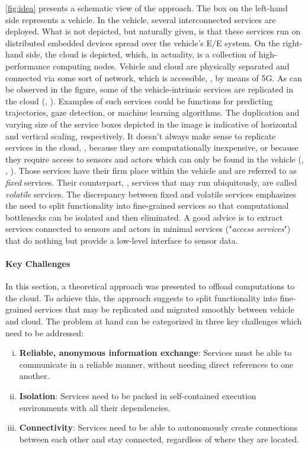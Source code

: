 \autoref{fig:idea} presents a schematic view of the approach. The box on the left-hand side represents a vehicle. In the vehicle, several interconnected services are deployed. What is not depicted, but naturally given, is that these services run on distributed embedded devices spread over the vehicle's E/E system. On the right-hand side, the cloud is depicted, which, in actuality, is a collection of high-performance computing nodes. Vehicle and cloud are physically separated and connected via some sort of network, which is accessible, \eg , by means of 5G. As can be observed in the figure, some of the vehicle-intrinsic services are replicated in the cloud (, ). Examples of such services could be functions for predicting trajectories, gaze detection, or machine learning algorithms. The duplication and varying size of the service boxes depicted in the image is indicative of horizontal and vertical scaling, respectively. It doesn't always make sense to replicate services in the cloud, \eg , because they are computationally inexpensive, or because they require access to sensors and actors which can only be found in the vehicle (, , ). Those services have their firm place within the vehicle and are referred to as \emph{fixed} services. Their counterpart, \ie , services that may run ubiquitously, are called \emph{volatile} services. The discrepancy between fixed and volatile services emphasizes the need to split functionality into fine-grained services so that computational bottlenecks can be isolated and then eliminated. A good advice is to extract services connected to sensors and actors in minimal services ("\emph{access services}") that do nothing but provide a low-level interface to sensor data.

\paragraph{Key Challenges}

In this section, a theoretical approach was presented to offload computations to the cloud. To achieve this, the approach suggests to split functionality into fine-grained services that may be replicated and migrated smoothly between vehicle and cloud. The problem at hand can be categorized in three key challenges which need to be addressed:

\begin{enumerate}[(i)]
\item \textbf{Reliable, anonymous information exchange}: Services must be able to communicate in a reliable manner, without needing direct references to one another.
\item \textbf{Isolation}: Services need to be packed in self-contained execution environments with all their dependencies.
\item \textbf{Connectivity}: Services need to be able to autonomously create connections between each other and stay connected, regardless of where they are located.
\end{enumerate}

